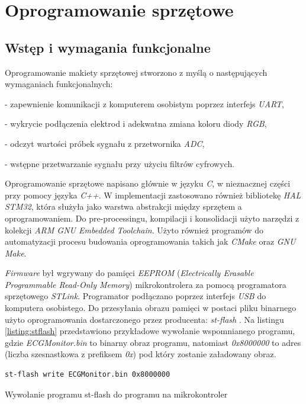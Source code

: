 
\chapter{Oprogramowanie sprzętowe}

\section{Wstęp i wymagania funkcjonalne}
Oprogramowanie makiety sprzętowej stworzono z myślą o następujących wymaganiach funkcjonalnych:

- zapewnienie komunikacji z komputerem osobistym poprzez interfejs \textit{UART},

- wykrycie podłączenia elektrod i adekwatna zmiana koloru diody \textit{RGB},

- odczyt wartości próbek sygnału z przetwornika \textit{ADC},

- wstępne przetwarzanie sygnału przy użyciu filtrów cyfrowych.  

Oprogramowanie sprzętowe napisano głównie w języku \textit{C}, w nieznacznej części przy 
pomocy języka \textit{C++}. W implementacji zastosowano również bibliotekę \textit{HAL STM32},
która służyła jako warstwa abstrakcji między sprzętem a oprogramowaniem. Do pre-processingu, 
kompilacji i konsolidacji użyto narzędzi z kolekcji \textit{ARM GNU Embedded Toolchain}. 
Użyto również programów do automatyzacji procesu
budowania oprogramowania takich jak \textit{CMake} oraz \textit{GNU Make}.

\textit{Firmware} był wgrywany do pamięci \textit{EEPROM} 
(\textit{Electrically Erasable Programmable Read-Only Memory}) mikrokontrolera za pomocą
programatora sprzętowego \textit{STLink}.
Programator podłączano poprzez interfejs \textit{USB} do komputera osobistego.
Do przesyłania obrazu pamięci w postaci
pliku binarnego użyto oprogramowania dostarczonego przez producenta: \textit{st-flash} 
\cite{stflash}. Na listingu \ref{listing:stflash} przedstawiono przykładowe wywołanie wspomnianego
programu, gdzie \textit{ECGMonitor.bin} to binarny obraz programu, natomiast \textit{0x8000000} to
adres (liczba szesnastkowa z prefiksem \textit{0x}) 
pod który zostanie załadowany obraz.

\begin{listing}
\begin{verbatim}
st-flash write ECGMonitor.bin 0x8000000
\end{verbatim}
\caption{Wywołanie programu st-flash do  programu na mikrokontroler}
\label{listing:stflash}
\end{listing}

